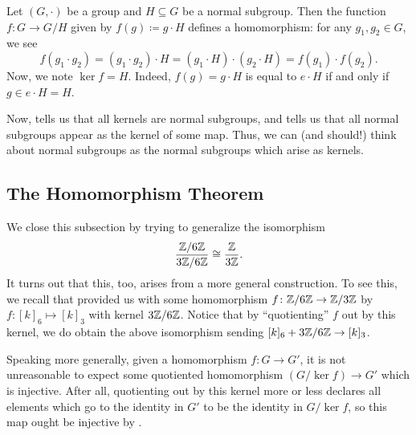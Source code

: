 \documentclass[../main.tex]{subfiles}
\begin{document}
\begin{example} \label{ex:ker-of-quotient}
    Let $(G,\cdot)$ be a group and $H\subseteq G$ be a normal subgroup. Then the function $f\colon G\to G/H$ given by $f(g)\coloneqq g\cdot H$ defines a homomorphism: for any $g_1,g_2\in G$, we see
    \[f(g_1\cdot g_2)=(g_1\cdot g_2)\cdot H=(g_1\cdot H)\cdot(g_2\cdot H)=f(g_1)\cdot f(g_2).\]
    Now, we note $\ker f=H$. Indeed, $f(g)=g\cdot H$ is equal to $e\cdot H$ if and only if $g\in e\cdot H=H$.
\end{example}
Now,  tells us that all kernels are normal subgroups, and  tells us that all normal subgroups appear as the kernel of some map. Thus, we can (and should!) think about normal subgroups as the normal subgroups which arise as kernels.

\subsection{The Homomorphism Theorem}
We close this subsection by trying to generalize the isomorphism
\[\frac{\mathbb Z/6\mathbb Z}{3\mathbb Z/6\mathbb Z}\cong\frac{\mathbb Z}{3\mathbb Z}.\]
It turns out that this, too, arises from a more general construction. To see this, we recall that  provided us with some homomorphism $f\colon\mathbb Z/6\mathbb Z\to\mathbb Z/3\mathbb Z$ by $f\colon[k]_6\mapsto[k]_3$ with kernel $3\mathbb Z/6\mathbb Z$. Notice that by ``quotienting'' $f$ out by this kernel, we do obtain the above isomorphism sending $[k]_6+3\mathbb Z/6\mathbb Z\to[k]_3$.

Speaking more generally, given a homomorphism $f\colon G\to G'$, it is not unreasonable to expect some quotiented homomorphism $(G/\ker f)\to G'$ which is injective. After all, quotienting out by this kernel more or less declares all elements which go to the identity in $G'$ to be the identity in $G/\ker f$, so this map ought be injective by .
\end{document}
